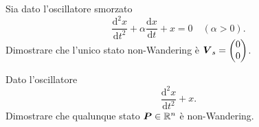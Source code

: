 \begin{ex}[]
    Sia dato l'oscillatore smorzato 
    \[
	\frac{\text{d} ^2x}{\text{d} t^2} + \alpha\frac{\text{d} x}{\text{d} t} + x = 0 \quad  (\alpha >0) 
    .\] 
    Dimostrare che l'unico stato non-Wandering è $\boldsymbol{V}_s = \begin{pmatrix} 0 \\ 0\end{pmatrix}$.
\end{ex}
\noindent
\begin{ex}[]
    Dato l'oscillatore
    \[
        \frac{\text{d} ^2x}{\text{d} t^2} + x
    .\] 
    Dimostrare che qualunque stato $\boldsymbol{P}\in \mathbb{R}^n$ è non-Wandering.
\end{ex}
\noindent
